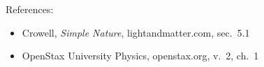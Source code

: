 References:
\begin{itemize}
\item Crowell, \emph{Simple Nature}, lightandmatter.com, sec.~5.1
\item OpenStax University Physics, openstax.org, v.~2, ch.~1
\end{itemize}
